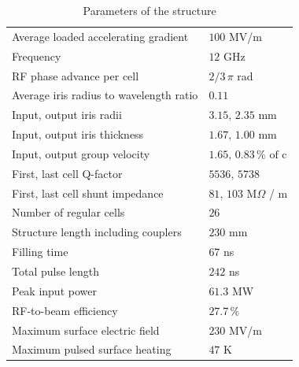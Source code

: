 \begin{table}[h]
  \centering
    \begin{tabular}{ l l  }
    \hline
    \hline
    Average loaded accelerating gradient			& $100$ MV/m	\\
    Frequency								& $12$ GHz	\\        
    RF phase advance per cell					& $2/3 \, \pi $ rad	\\       
    Average iris radius to wavelength ratio			& $0.11$	\\ 
    Input, output iris radii      					& $3.15, \, 2.35 $ mm	\\
    Input, output iris thickness      				& $1.67, \, 1.00 $ mm	\\
    Input, output group velocity					& $1.65, \, 0.83 \, \% \text{ of c} $	\\
    First, last cell Q-factor						& $5536,\,5738$\\
    First, last cell shunt impedance				& $81,\,103 $ M$\Omega$ / m\\
    Number of regular cells						& $26$	\\   
    Structure length including couplers			& $230 $ mm	\\   
    Filling time								& $67 $ ns	\\               
    Total pulse length							& $242 $ ns	\\      
    Peak input power 							& $61.3 $ MW	\\        
    RF-to-beam efficiency						& $27.7 \, \%$	\\   
    Maximum surface electric field				& $230 $ MV/m	\\           
    Maximum pulsed surface heating				& $47 $ K	\\       
    \hline
    \hline
    \end{tabular}
  \caption{Parameters of the structure}
\label{TD26_param_1}
\end{table}

